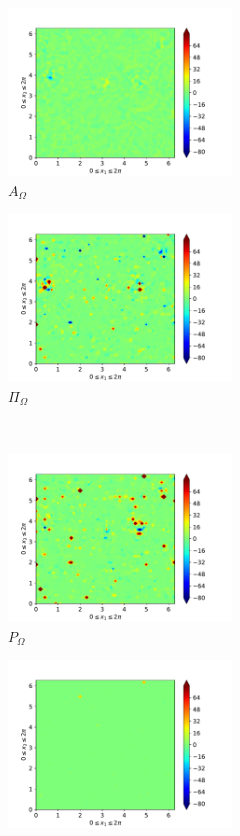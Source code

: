 \begin{figure}[H]
\begin{subfigure}{0.45\textwidth}
        \includegraphics[height=1.75in]{media/run-cds-65/A-enst-1420}
        \caption{$A_{\Omega}$}
    \end{subfigure}
    \newline
    \begin{subfigure}{0.45\textwidth}
        \includegraphics[height=1.75in]{media/run-cds-65/Pi-enst-1420}
        \caption{$\Pi_{\Omega}$}
    \end{subfigure}
    ~
    \begin{subfigure}{0.45\textwidth}
        \includegraphics[height=1.75in]{media/run-cds-65/P-enst-1420}
        \caption{$P_{\Omega}$}
    \end{subfigure}
    \newline
    \begin{subfigure}{0.45\textwidth}
        \includegraphics[height=1.75in]{media/run-cds-65/B-enst-1420}

\end{subfigure}
\end{figure}
